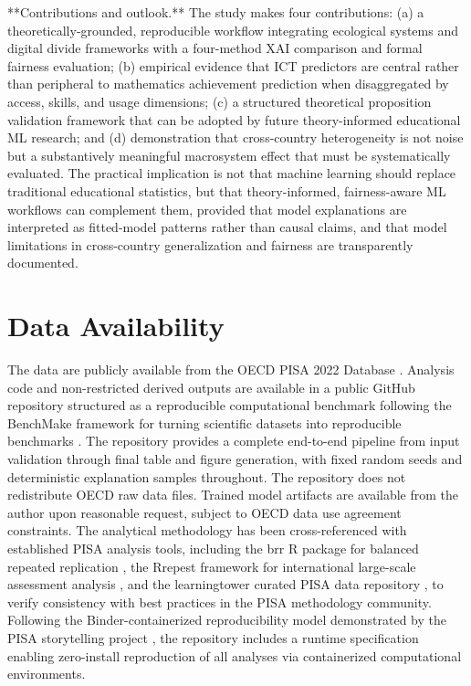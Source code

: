 \documentclass[pdflatex,sn-mathphys-ay]{sn-jnl}
\begin{document}
**Contributions and outlook.** The study makes four contributions: (a) a theoretically-grounded, reproducible workflow integrating ecological systems and digital divide frameworks with a four-method XAI comparison and formal fairness evaluation; (b) empirical evidence that ICT predictors are central rather than peripheral to mathematics achievement prediction when disaggregated by access, skills, and usage dimensions; (c) a structured theoretical proposition validation framework that can be adopted by future theory-informed educational ML research; and (d) demonstration that cross-country heterogeneity is not noise but a substantively meaningful macrosystem effect that must be systematically evaluated. The practical implication is not that machine learning should replace traditional educational statistics, but that theory-informed, fairness-aware ML workflows can complement them, provided that model explanations are interpreted as fitted-model patterns rather than causal claims, and that model limitations in cross-country generalization and fairness are transparently documented.

\section{Data Availability}

The data are publicly available from the OECD PISA 2022 Database \citep{OECD_2022_database}. Analysis code and non-restricted derived outputs are available in a public GitHub repository structured as a reproducible computational benchmark following the BenchMake framework for turning scientific datasets into reproducible benchmarks \citep{BenchMake_2025}. The repository provides a complete end-to-end pipeline from input validation through final table and figure generation, with fixed random seeds and deterministic explanation samples throughout. The repository does not redistribute OECD raw data files. Trained model artifacts are available from the author upon reasonable request, subject to OECD data use agreement constraints. The analytical methodology has been cross-referenced with established PISA analysis tools, including the brr R package for balanced repeated replication \citep{debrouwere_brr_2024}, the Rrepest framework for international large-scale assessment analysis \citep{Rrepest_2024}, and the learningtower curated PISA data repository \citep{learningtower_2024}, to verify consistency with best practices in the PISA methodology community. Following the Binder-containerized reproducibility model demonstrated by the PISA storytelling project \citep{research_reuse_PISA_binder}, the repository includes a runtime specification enabling zero-install reproduction of all analyses via containerized computational environments.
\end{document}
